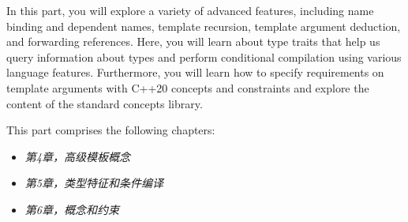 In this part, you will explore a variety of advanced features, including name binding and dependent names, template recursion, template argument deduction, and forwarding references. Here, you will learn about type traits that help us query information about types and perform conditional compilation using various language features. Furthermore, you will learn how to specify requirements on template arguments with C++20 concepts and constraints and explore the content of the standard concepts library.

This part comprises the following chapters:

\begin{itemize}
\item
\textit{第4章，高级模板概念}

\item
\textit{第5章，类型特征和条件编译}

\item
\textit{第6章，概念和约束}
\end{itemize}







